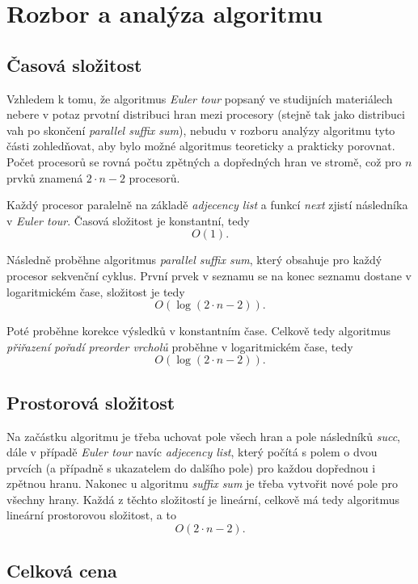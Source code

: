 \documentclass[12pt]{article}
\begin{document}
\section{Rozbor a analýza algoritmu}

\subsection{Časová složitost}

Vzhledem k tomu, že algoritmus \textit{Euler tour} popsaný ve studijních materiálech nebere v potaz prvotní distribuci hran mezi procesory (stejně tak jako distribuci vah po skončení \textit{parallel suffix sum}), nebudu v rozboru analýzy algoritmu tyto části zohledňovat, aby bylo možné algoritmus teoreticky a prakticky porovnat. Počet procesorů se rovná počtu zpětných a dopředných hran ve stromě, což pro $n$ prvků znamená $2 \cdot n - 2$ procesorů.

Každý procesor paralelně na základě \textit{adjecency list} a funkcí \textit{next} zjistí následníka v \textit{Euler tour}. Časová složitost je konstantní, tedy
$$ O(1). $$

Následně proběhne algoritmus \textit{parallel suffix sum}, který obsahuje pro každý procesor sekvenční cyklus. První prvek v seznamu se na konec seznamu dostane v logaritmickém čase, složitost je tedy 
$$ O(\log (2\cdot n - 2)).$$ 

Poté proběhne korekce výsledků v konstantním čase. Celkově tedy algoritmus \textit{přiřazení pořadí preorder vrcholů} proběhne v logaritmickém čase, tedy
$$ O(\log (2\cdot n - 2)). $$


\subsection{Prostorová složitost}

Na začástku algoritmu je třeba uchovat pole všech hran a pole následníků \textit{succ}, dále v případě \textit{Euler tour} navíc \textit{adjecency list}, který počítá s polem o dvou prvcích (a případně s ukazatelem do dalšího pole) pro každou dopřednou i zpětnou hranu. Nakonec u algoritmu \textit{suffix sum} je třeba vytvořit nové pole pro všechny hrany. Každá z těchto složitostí je lineární, celkově má tedy algoritmus lineární prostorovou složitost, a to
$$ O(2\cdot n - 2). $$

\subsection{Celková cena}
\end{document}
